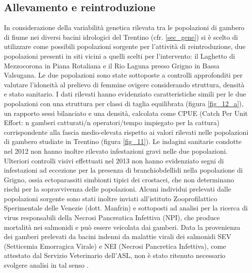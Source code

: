 \documentclass[11pt,a4paper,italian,twoside,openany]{memoir}
\begin{document}
\subsection{Allevamento e reintroduzione}
\label{sub_allevamento}
In considerazione della variabilità genetica rilevata tra le popolazioni di gambero di fiume nei diversi bacini idrologici del Trentino (cfr. \ref{sec_gene}) si è scelto di utilizzare come possibili popolazioni sorgente per l'attività di reintroduzione, due popolazioni presenti in siti vicini a quelli scelti per l'intervento: il Laghetto di Mezzocorona in Piana Rotaliana e il Rio Laguna presso Grigno in Bassa Valsugana. Le due popolazioni sono state sottoposte a controlli approfonditi per valutare l'idoneità al prelievo di femmine ovigere considerando struttura, densità e stato sanitario. I dati rilevati hanno evidenziato caratteristiche simili per le due popolazioni con una struttura per classi di taglia equilibrata (figura \ref{fig_12_a}), un rapporto sessi bilanciato e una densità, calcolata come CPUE (Catch Per Unit Effort: n gamberi catturati/n operatori/tempo impiegato per la cattura) corrispondente alla fascia medio-elevata rispetto ai valori rilevati nelle popolazioni di gambero studiate in Trentino (figura \ref{fig_11}). Le indagini sanitarie condotte nel 2012 \cite{Minghetti 2012b} non hanno inoltre rilevato infestazioni gravi nelle due popolazioni. Ulteriori controlli visivi effettuati nel 2013 non hanno evidenziato segni di infestazioni ad eccezione per la presenza di branchiobdellidi nella popolazione di Grigno, ossia ectoparassiti simbionti tipici dei crostacei, che non determinano rischi per la sopravvivenza delle popolazioni. Alcuni individui prelevati dalle popolazioni sorgente sono stati inoltre inviati all'istituto Zooprofilattico Sperimentale delle Venezie (dott. Manfrin) e sottoposti ad analisi per la ricerca di virus responsabili della Necrosi Pancreatica Infettiva (NPI), che produce mortalità nei salmonidi e può essere veicolata dai gamberi. Data la provenienza dei gamberi prelevati da bacini indenni da malattie virali dei salmonidi SEV (Setticemia Emorragica Virale) e NEI (Necrosi Pancretica Infettiva), come attestato dal Servizio Veterinario dell'ASL, non è stato ritenuto necessario svolgere analisi in tal senso \cite{Cappelletti 2016}.
\end{document}
